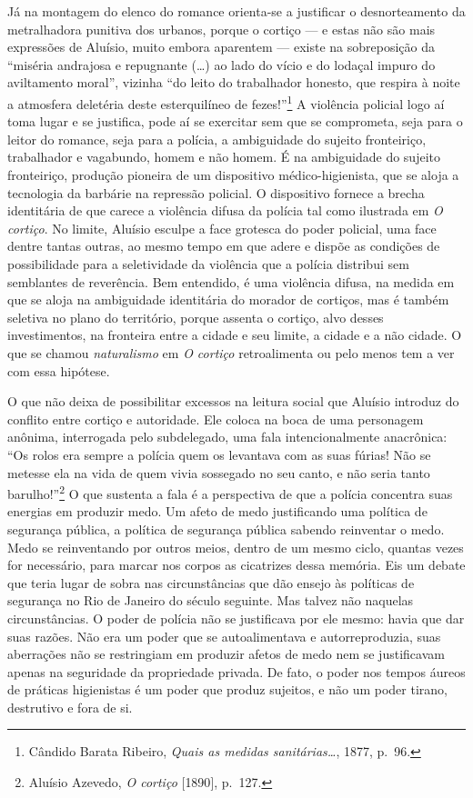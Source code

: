 Já na montagem do elenco do romance orienta-se a justificar o
desnorteamento da metralhadora punitiva dos urbanos, porque o cortiço ---
e estas não são mais expressões de Aluísio, muito embora aparentem ---
existe na sobreposição da ``miséria andrajosa e repugnante (\ldots{}) ao
lado do vício e do lodaçal impuro do aviltamento moral'', vizinha ``do
leito do trabalhador honesto, que respira à noite a atmosfera deletéria
deste esterquilíneo de fezes!''\footnote{Cândido Barata Ribeiro,
  \textit{Quais as medidas sanitárias\ldots{}}, 1877, p.~96.} A violência
policial logo aí toma lugar e se justifica, pode aí se exercitar sem que
se comprometa, seja para o leitor do romance, seja para a polícia, a
ambiguidade do sujeito fronteiriço, trabalhador e vagabundo, homem e não
homem. É na ambiguidade do sujeito fronteiriço, produção pioneira de um
dispositivo médico-higienista, que se aloja a tecnologia da barbárie na
repressão policial. O dispositivo fornece a brecha identitária de que
carece a violência difusa da polícia tal como ilustrada em \textit{O
cortiço}. No limite, Aluísio esculpe a face grotesca do poder policial,
uma face dentre tantas outras, ao mesmo tempo em que adere e dispõe as
condições de possibilidade para a seletividade da violência que a
polícia distribui sem semblantes de reverência. Bem entendido, é uma
violência difusa, na medida em que se aloja na ambiguidade identitária
do morador de cortiços, mas é também seletiva no plano do território,
porque assenta o cortiço, alvo desses investimentos, na fronteira entre
a cidade e seu limite, a cidade e a não cidade. O que se chamou
\textit{naturalismo} em \textit{O cortiço} retroalimenta ou pelo menos tem a
ver com essa hipótese.

O que não deixa de possibilitar excessos na leitura social que Aluísio
introduz do conflito entre cortiço e autoridade. Ele coloca na boca de
uma personagem anônima, interrogada pelo subdelegado, uma fala
intencionalmente anacrônica: ``Os rolos era sempre a polícia quem os
levantava com as suas fúrias! Não se metesse ela na vida de quem vivia
sossegado no seu canto, e não seria tanto barulho!''\footnote{Aluísio
  Azevedo, \textit{O cortiço} {[}1890{]}, p.~127.} O que sustenta a fala é
a perspectiva de que a polícia concentra suas energias em produzir medo.
Um afeto de medo justificando uma política de segurança pública, a
política de segurança pública sabendo reinventar o medo. Medo se
reinventando por outros meios, dentro de um mesmo ciclo, quantas vezes
for necessário, para marcar nos corpos as cicatrizes dessa memória. Eis
um debate que teria lugar de sobra nas circunstâncias que dão ensejo às
políticas de segurança no Rio de Janeiro do século seguinte. Mas talvez
não naquelas circunstâncias. O poder de polícia não se justificava por
ele mesmo: havia que dar suas razões. Não era um poder que se
autoalimentava e autorreproduzia, suas aberrações não se restringiam em
produzir afetos de medo nem se justificavam apenas na seguridade da
propriedade privada. De fato, o poder nos tempos áureos de práticas
higienistas é um poder que produz sujeitos, e não um poder tirano,
destrutivo e fora de si.

